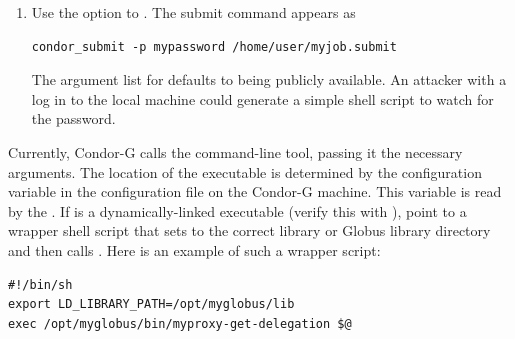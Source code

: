 \begin{enumerate}
\item{Use the  option to .}
The submit command appears as
\footnotesize
\begin{verbatim}
condor_submit -p mypassword /home/user/myjob.submit
\end{verbatim}
\normalsize
The argument list for  defaults to
being publicly available.
An attacker with a log in to the local machine could
generate a simple shell script
to watch for the password. 

\end{enumerate}

Currently, Condor-G calls the
 command-line tool,
passing it the necessary arguments.
The location of the
 executable is determined by the
configuration variable
 in the configuration file
on the Condor-G machine.
This variable is read by the .
If
is a dynamically-linked executable
(verify this with ),
point
to a wrapper shell script that sets
 to the correct 
library or Globus library directory and then
calls .
Here is an example of such a wrapper script:

\footnotesize
\begin{verbatim}
#!/bin/sh
export LD_LIBRARY_PATH=/opt/myglobus/lib
exec /opt/myglobus/bin/myproxy-get-delegation $@
\end{verbatim}
\normalsize

